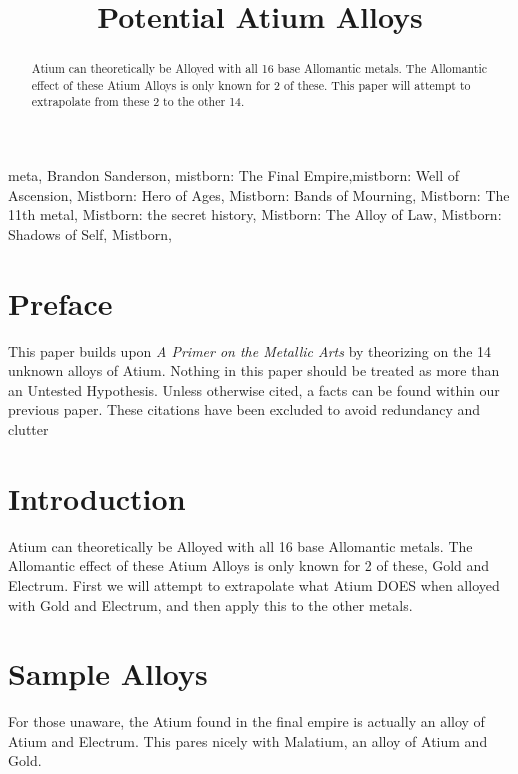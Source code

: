 \documentclass[conference]{IEEEtran}
\begin{document}
\title{Potential Atium Alloys}

\author{
}

\maketitle

\begin{abstract}
Atium can theoretically be Alloyed with all 16 base Allomantic metals.  The Allomantic effect of these Atium Alloys is only known for 2 of these.  This paper will attempt to extrapolate from these 2 to the other 14.
\end{abstract}

\begin{IEEEkeywords}
meta, Brandon Sanderson, mistborn: The Final Empire,mistborn: Well of Ascension, Mistborn: Hero of Ages, Mistborn: Bands of Mourning, Mistborn: The 11th metal, Mistborn: the secret history, Mistborn: The Alloy of Law, Mistborn: Shadows of Self, Mistborn, 
\end{IEEEkeywords}
\section*{Preface}
This paper builds upon \emph{A Primer on the Metallic Arts}\cite{prior} by theorizing on the 14 unknown alloys of Atium.  Nothing in this paper should be treated as more than an Untested Hypothesis.  Unless otherwise cited, a facts can be found within our previous paper.\cite{prior}  These citations have been excluded to avoid redundancy and clutter \section{Introduction}

Atium can theoretically be Alloyed with all 16 base Allomantic metals.  The Allomantic effect of these Atium Alloys is only known for 2 of these, Gold and Electrum.  First we will attempt to extrapolate what Atium DOES when alloyed with Gold and Electrum, and then apply this to the other metals.
\section{Sample Alloys}
For those unaware, the Atium found in the final empire is actually an alloy of Atium and Electrum.  This pares nicely with Malatium, an alloy of Atium and Gold.
\end{document}
